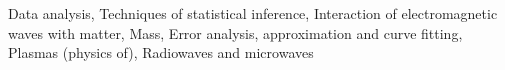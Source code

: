 \documentclass[]{article}
\begin{document}
Data analysis, Techniques of statistical inference, Interaction of electromagnetic waves with matter, Mass, Error analysis, approximation and curve fitting, Plasmas (physics of), Radiowaves and microwaves
\end{document}
